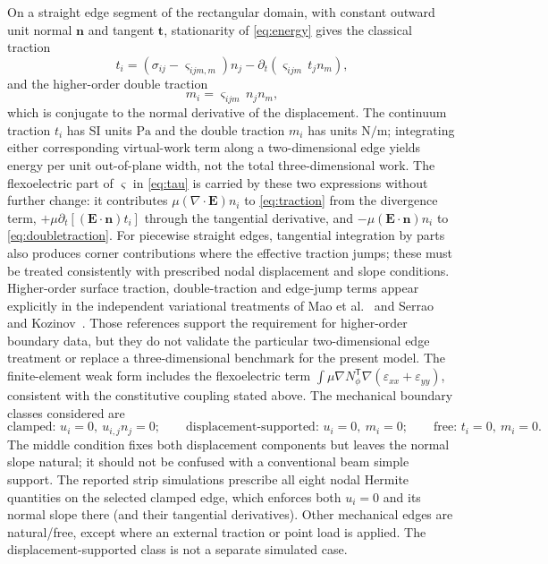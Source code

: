 On a straight edge segment of the rectangular domain, with constant
outward unit normal $\bm{n}$ and tangent $\bm{t}$, stationarity
of \eqref{eq:energy} gives the classical traction
\begin{equation}
  t_i = \left(\sigma_{ij}-\varsigma_{ijm,m}\right)n_j
      - \partial_t\!\left(\varsigma_{ijm}\,t_j n_m\right),
  \label{eq:traction}
\end{equation}
and the higher-order double traction
\begin{equation}
  m_i = \varsigma_{ijm}\,n_j n_m ,
  \label{eq:doubletraction}
\end{equation}
which is conjugate to the normal derivative of the displacement.
The continuum traction $t_i$ has SI units $\si{\pascal}$ and the double
traction $m_i$ has units $\si{\newton\per\meter}$; integrating either
corresponding virtual-work term along a two-dimensional edge yields energy
per unit out-of-plane width, not the total three-dimensional work. The
flexoelectric part of $\varsigma$ in \eqref{eq:tau} is carried by these two
expressions without further change: it contributes $\mu(\nabla\cdot\bm E)n_i$
to \eqref{eq:traction} from the divergence term,
$+\mu\partial_t[(\bm E\cdot\bm n)t_i]$ through the tangential derivative, and
$-\mu(\bm E\cdot\bm n)n_i$ to \eqref{eq:doubletraction}. For piecewise straight edges, tangential integration by parts also
produces corner contributions where the effective traction jumps; these
must be treated consistently with prescribed nodal displacement and slope
conditions. Higher-order surface traction, double-traction and edge-jump
terms appear explicitly in the independent variational treatments of
Mao et al.~\cite{MaoPurohitAravas2016} and Serrao and
Kozinov~\cite{SerraoKozinov2024}. Those references support the requirement
for higher-order boundary data, but they do not validate the particular
two-dimensional edge treatment or replace a three-dimensional benchmark
for the present model. The finite-element weak form includes the flexoelectric term
$\int\mu\nabla N_\phi^{\mathsf T}\nabla(\varepsilon_{xx}+\varepsilon_{yy})$, consistent with the constitutive coupling stated above. The mechanical boundary classes considered are
\begin{equation}
  \text{clamped: } u_i=0,\ u_{i,j}n_j=0;\qquad
  \text{displacement-supported: } u_i=0,\ m_i=0;\qquad
  \text{free: } t_i=0,\ m_i=0 .
  \label{eq:bcmech}
\end{equation}
The middle condition fixes both displacement components but leaves the normal
slope natural; it should not be confused with a conventional beam simple
support. The reported strip simulations prescribe all eight nodal Hermite
quantities on the selected clamped edge, which enforces both $u_i=0$ and its
normal slope there (and their tangential derivatives). Other mechanical
edges are natural/free, except where an external traction or point load is
applied. The displacement-supported class is not a separate simulated case.

